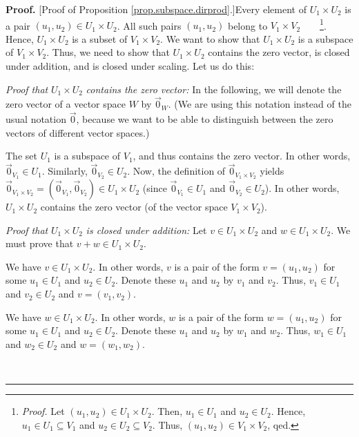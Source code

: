 \documentclass[numbers=enddot,12pt,final,onecolumn,notitlepage]{scrartcl}%
\theoremstyle{definition}
\newenvironment{proof}[1][Proof]{\noindent\textbf{#1.} }{\ \rule{0.5em}{0.5em}}
\begin{document}
\begin{proof}
[Proof of Proposition \ref{prop.subspace.dirprod}.]Every element of
$U_{1}\times U_{2}$ is a pair $\left(  u_{1},u_{2}\right)  \in U_{1}\times
U_{2}$. All such pairs $\left(  u_{1},u_{2}\right)  $ belong to $V_{1}\times
V_{2}$\ \ \ \ \footnote{\textit{Proof.} Let $\left(  u_{1},u_{2}\right)  \in
U_{1}\times U_{2}$. Then, $u_{1}\in U_{1}$ and $u_{2}\in U_{2}$. Hence,
$u_{1}\in U_{1}\subseteq V_{1}$ and $u_{2}\in U_{2}\subseteq V_{2}$. Thus,
$\left(  u_{1},u_{2}\right)  \in V_{1}\times V_{2}$, qed.}. Hence,
$U_{1}\times U_{2}$ is a subset of $V_{1}\times V_{2}$. We want to show that
$U_{1}\times U_{2}$ is a subspace of $V_{1}\times V_{2}$. Thus, we need to
show that $U_{1}\times U_{2}$ contains the zero vector, is closed under
addition, and is closed under scaling. Let us do this:

\textit{Proof that }$U_{1}\times U_{2}$\textit{ contains the zero vector:} In
the following, we will denote the zero vector of a vector space $W$ by
$\overrightarrow{0}_{W}$. (We are using this notation instead of the usual
notation $\overrightarrow{0}$, because we want to be able to distinguish
between the zero vectors of different vector spaces.)

The set $U_{1}$ is a subspace of $V_{1}$, and thus contains the zero vector.
In other words, $\overrightarrow{0}_{V_{1}}\in U_{1}$. Similarly,
$\overrightarrow{0}_{V_{2}}\in U_{2}$. Now, the definition of
$\overrightarrow{0}_{V_{1}\times V_{2}}$ yields $\overrightarrow{0}%
_{V_{1}\times V_{2}}=\left(  \overrightarrow{0}_{V_{1}},\overrightarrow{0}%
_{V_{2}}\right)  \in U_{1}\times U_{2}$ (since $\overrightarrow{0}_{V_{1}}\in
U_{1}$ and $\overrightarrow{0}_{V_{2}}\in U_{2}$). In other words,
$U_{1}\times U_{2}$ contains the zero vector (of the vector space $V_{1}\times
V_{2}$).

\textit{Proof that }$U_{1}\times U_{2}$ \textit{is closed under addition:} Let
$v\in U_{1}\times U_{2}$ and $w\in U_{1}\times U_{2}$. We must prove that
$v+w\in U_{1}\times U_{2}$.

We have $v\in U_{1}\times U_{2}$. In other words, $v$ is a pair of the form
$v=\left(  u_{1},u_{2}\right)  $ for some $u_{1}\in U_{1}$ and $u_{2}\in
U_{2}$. Denote these $u_{1}$ and $u_{2}$ by $v_{1}$ and $v_{2}$. Thus,
$v_{1}\in U_{1}$ and $v_{2}\in U_{2}$ and $v=\left(  v_{1},v_{2}\right)  $.

We have $w\in U_{1}\times U_{2}$. In other words, $w$ is a pair of the form
$w=\left(  u_{1},u_{2}\right)  $ for some $u_{1}\in U_{1}$ and $u_{2}\in
U_{2}$. Denote these $u_{1}$ and $u_{2}$ by $w_{1}$ and $w_{2}$. Thus,
$w_{1}\in U_{1}$ and $w_{2}\in U_{2}$ and $w=\left(  w_{1},w_{2}\right)  $.


\end{proof}
\end{document}
